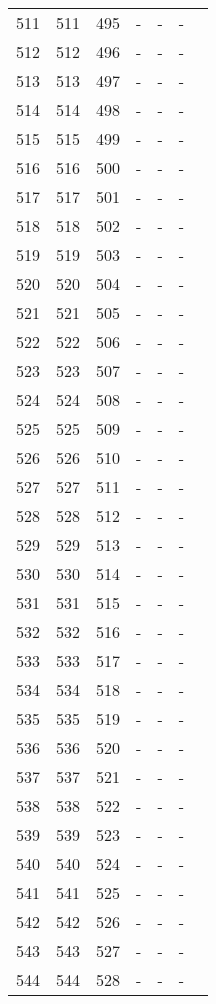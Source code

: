 \begin{longtable}{rrrllll}
  511 & 511 & 495 & - & - & - &  \\ 
  512 & 512 & 496 & - & - & - &  \\ 
  513 & 513 & 497 & - & - & - &  \\ 
  514 & 514 & 498 & - & - & - &  \\ 
  515 & 515 & 499 & - & - & - &  \\ 
  516 & 516 & 500 & - & - & - &  \\ 
  517 & 517 & 501 & - & - & - &  \\ 
  518 & 518 & 502 & - & - & - &  \\ 
  519 & 519 & 503 & - & - & - &  \\ 
  520 & 520 & 504 & - & - & - &  \\ 
  521 & 521 & 505 & - & - & - &  \\ 
  522 & 522 & 506 & - & - & - &  \\ 
  523 & 523 & 507 & - & - & - &  \\ 
  524 & 524 & 508 & - & - & - &  \\ 
  525 & 525 & 509 & - & - & - &  \\ 
  526 & 526 & 510 & - & - & - &  \\ 
  527 & 527 & 511 & - & - & - &  \\ 
  528 & 528 & 512 & - & - & - &  \\ 
  529 & 529 & 513 & - & - & - &  \\ 
  530 & 530 & 514 & - & - & - &  \\ 
  531 & 531 & 515 & - & - & - &  \\ 
  532 & 532 & 516 & - & - & - &  \\ 
  533 & 533 & 517 & - & - & - &  \\ 
  534 & 534 & 518 & - & - & - &  \\ 
  535 & 535 & 519 & - & - & - &  \\ 
  536 & 536 & 520 & - & - & - &  \\ 
  537 & 537 & 521 & - & - & - &  \\ 
  538 & 538 & 522 & - & - & - &  \\ 
  539 & 539 & 523 & - & - & - &  \\ 
  540 & 540 & 524 & - & - & - &  \\ 
  541 & 541 & 525 & - & - & - &  \\ 
  542 & 542 & 526 & - & - & - &  \\ 
  543 & 543 & 527 & - & - & - &  \\ 
  544 & 544 & 528 & - & - & - &  \\ 

\end{longtable}
